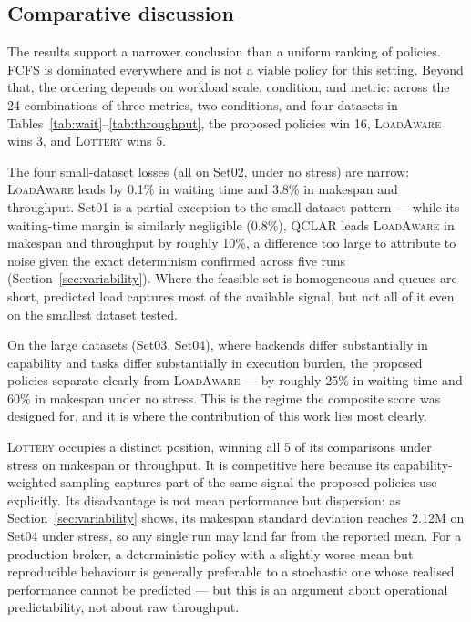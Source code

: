 \documentclass[preprint,12pt]{elsarticle}
\newcommand{\QCLAR}{\textsc{QCLAR}}
\newcommand{\LoadAware}{\textsc{LoadAware}}
\newcommand{\FCFS}{\textsc{FCFS}}
\newcommand{\Lottery}{\textsc{Lottery}}
\begin{document}
\subsection{Comparative discussion}
The results support a narrower conclusion than a uniform ranking of policies.
\FCFS{} is dominated everywhere and is not a viable policy for this setting.
Beyond that, the ordering depends on workload scale, condition, and metric:
across the 24 combinations of three metrics, two conditions, and four datasets
in Tables~\ref{tab:wait}--\ref{tab:throughput}, the proposed policies win 16,
\LoadAware{} wins 3, and \Lottery{} wins 5.

The four small-dataset losses (all on Set02, under no stress) are narrow:
\LoadAware{} leads by 0.1\% in waiting time and 3.8\% in makespan and
throughput. Set01 is a partial exception to the small-dataset pattern --- while
its waiting-time margin is similarly negligible (0.8\%), \QCLAR{} leads
\LoadAware{} in makespan and throughput by roughly 10\%, a difference too large
to attribute to noise given the exact determinism confirmed across five runs
(Section~\ref{sec:variability}). Where the feasible set is homogeneous and
queues are short, predicted load captures most of the available signal, but not
all of it even on the smallest dataset tested.

On the large datasets (Set03, Set04), where backends differ substantially in
capability and tasks differ substantially in execution burden, the proposed
policies separate clearly from \LoadAware{} --- by roughly 25\% in waiting time
and 60\% in makespan under no stress. This is the regime the composite score was
designed for, and it is where the contribution of this work lies most clearly.

\Lottery{} occupies a distinct position, winning all 5 of its comparisons under
stress on makespan or throughput. It is competitive here because its
capability-weighted sampling captures part of the same signal the proposed
policies use explicitly. Its disadvantage is not mean performance but
dispersion: as Section~\ref{sec:variability} shows, its makespan standard
deviation reaches 2.12M on Set04 under stress, so any single run may land far
from the reported mean. For a production broker, a deterministic policy with a
slightly worse mean but reproducible behaviour is generally preferable to a
stochastic one whose realised performance cannot be predicted --- but this is an
argument about operational predictability, not about raw throughput.
\end{document}
